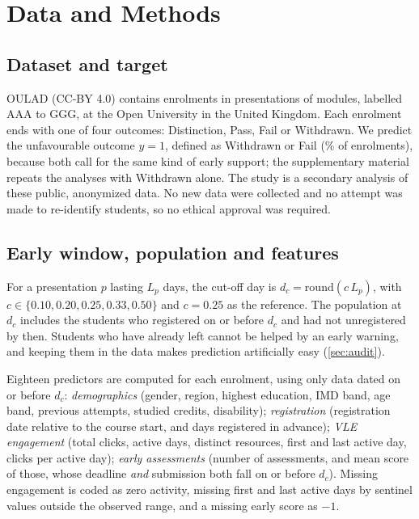 \documentclass[fleqn,10pt]{JLA_article}
\begin{document}
\section{Data and Methods}
\label{sec:methods}

\subsection{Dataset and target}
OULAD \parencite{kuzilek2017oulad} (CC-BY 4.0) contains \resNEnrol{} enrolments in \resNPres{} presentations of \resNModules{} modules, labelled AAA to GGG, at the Open University in the United Kingdom. Each enrolment ends with one of four outcomes: Distinction, Pass, Fail or Withdrawn. We predict the unfavourable outcome $y=1$, defined as Withdrawn or Fail (\resRiskAll\% of enrolments), because both call for the same kind of early support; the supplementary material repeats the analyses with Withdrawn alone. The study is a secondary analysis of these public, anonymized data. No new data were collected and no attempt was made to re-identify students, so no ethical approval was required.

\subsection{Early window, population and features}
For a presentation $p$ lasting $L_p$ days, the cut-off day is $d_c=\mathrm{round}(c\,L_p)$, with $c\in\{0.10,0.20,0.25,0.33,0.50\}$ and $c=0.25$ as the reference. The population at $d_c$ includes the students who registered on or before $d_c$ and had not unregistered by then. Students who have already left cannot be helped by an early warning, and keeping them in the data makes prediction artificially easy (\cref{sec:audit}).

Eighteen predictors are computed for each enrolment, using only data dated on or before $d_c$:
\emph{demographics} (gender, region, highest education, IMD band, age band, previous attempts, studied credits, disability);
\emph{registration} (registration date relative to the course start, and days registered in advance);
\emph{VLE engagement} (total clicks, active days, distinct resources, first and last active day, clicks per active day);
\emph{early assessments} (number of assessments, and mean score of those, whose deadline \emph{and} submission both fall on or before $d_c$). Missing engagement is coded as zero activity, missing first and last active days by sentinel values outside the observed range, and a missing early score as $-1$.
\end{document}
